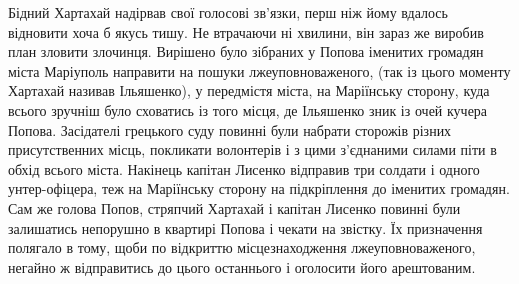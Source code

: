 \documentclass[a4paper,20pt]{report}
\begin{document}
Бідний Хартахай надірвав свої голосові зв'язки, перш ніж йому вдалось відновити
хоча б якусь тишу. Не втрачаючи ні хвилини, він зараз же виробив план зловити
злочинця. Вирішено було зібраних у Попова іменитих громадян міста Маріуполь
направити на пошуки лжеуповноваженого, (так із цього моменту Хартахай називав
Ільяшенко), у передмістя міста, на Маріїнську сторону, куда всього зручніш було
сховатись із того місця, де Ільяшенко зник із очей кучера Попова. Засідателі
грецького суду повинні були набрати сторожів різних присутственних місць,
покликати волонтерів і з цими з'єднаними силами піти в обхід всього міста.
Накінець капітан Лисенко відправив три солдати і одного унтер-офіцера, теж на
Маріїнську сторону на підкріплення до іменитих громадян. Сам же голова Попов,
стряпчий Хартахай і капітан Лисенко повинні були залишатись непорушно в
квартирі Попова і чекати на звістку. Їх призначення полягало в тому, щоби по
відкриттю місцезнаходження лжеуповноваженого, негайно ж відправитись до цього
останнього і оголосити його арештованим.
\end{document}
